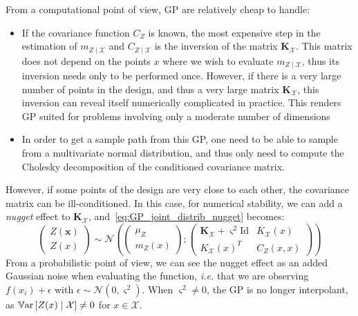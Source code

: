 \documentclass[../../Main_ManuscritThese.tex]{subfiles}
\begin{document}
From a computational point of view, GP are relatively cheap to handle:
\begin{itemize}
\item If the covariance function $C_Z$ is known, the most expensive
  step in the estimation of $m_{Z\mid \mathcal{X}}$ and
  $C_{Z \mid \mathcal{X}}$ is the inversion of the matrix
  $\mathbf{K}_{\mathcal{X}}$. This matrix does not depend on the
  points $x$ where we wish to evaluate $m_{Z\mid \mathcal{X}}$, thus
  its inversion needs only to be performed once. However, if there is
  a very large number of points in the design, and thus a very large
  matrix $\mathbf{K}_{\mathcal{X}}$, this inversion can reveal itself
  numerically complicated in practice. This renders GP suited for
  problems involving only a moderate number of
  dimensions %
\item In order to get a sample path from this GP, one need to be able
  to sample from a multivariate normal distribution, and thus only
  need to compute the Cholesky decomposition of the conditioned
  covariance matrix.
\end{itemize}
However, if some points of the design are very close to each other,
the covariance matrix can be ill-conditioned. In this case, for
numerical stability, we can add a \emph{nugget} effect to
$\mathbf{K}_{\mathcal{X}}$, and~\eqref{eq:GP_joint_distrib_nugget}
becomes:
\begin{equation}
  \label{eq:GP_joint_distrib_nugget}
  \begin{pmatrix}
    Z(\mathbf{x}) \\
    Z(x)
  \end{pmatrix} \sim
  \mathcal{N}\left(
    \begin{pmatrix}
      \mu_Z \\
      m_{Z}(x)
    \end{pmatrix} ;
    \begin{pmatrix}
      \mathbf{K}_{\mathcal{X}} + \varsigma^2\mathrm{Id}& K_{\mathcal{X}}(x) \\
       K_{\mathcal{X}}(x)^T & C_Z(x, x)
    \end{pmatrix}
\right)
\end{equation}
From a probabilistic point of view, we can see the nugget effect as an
added Gaussian noise when evaluating the function, \emph{i.e.} that we
are observing $f(x_i)+\epsilon$ with
$\epsilon \sim \mathcal{N}(0, \varsigma^2)$. When
$\varsigma^2 \neq 0$, the GP is no longer interpolant, as
$\mathbb{V}\mathrm{ar}\left[Z(x) \mid \mathcal{X}\right] \neq 0$ for
$x\in \mathcal{X}$.
\end{document}
